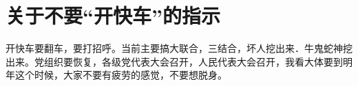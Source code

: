 \section[关于不要“开快车”的指示（一九六七年七月十三日）]{关于不要“开快车”的指示}


开快车要翻车，要打招呼。当前主要搞大联合，三结合，坏人挖出来．牛鬼蛇神挖出来。党组织要恢复，各级党代表大会召开，人民代表大会召开，我看大体要到明年这个时候，大家不要有疲劳的感觉，不要想脱身。


